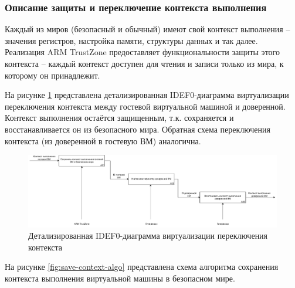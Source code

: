 \subsubsection{Описание защиты и переключение контекста выполнения}

Каждый из миров (безопасный и обычный) имеют свой контекст выполнения -- значения регистров, настройка памяти, структуры данных и так далее. Реализация ARM TrustZone предоставляет функциональности защиты этого контекста -- каждый контекст доступен для чтения и записи только из мира, к которому он принадлежит.

На рисунке \ref{fig:idef0-context-switch-2} представлена детализированная IDEF0-диаграмма виртуализации переключения контекста между гостевой виртуальной машиной и доверенной. Контекст выполнения остаётся защищенным, т.к. сохраняется и восстанавливается он из безопасного мира. Обратная схема переключения контекста (из доверенной в гостевую ВМ) аналогична.

\begin{figure}[h]
	\centering
	\includegraphics[width=\textwidth]{img/idef0-context-switch-2.pdf}
	\caption{Детализированная IDEF0-диаграмма виртуализации переключения контекста}
	\label{fig:idef0-context-switch-2}
\end{figure}

На рисунке \ref{fig:save-context-algo} представлена схема алгоритма сохранения контекста выполнения виртуальной машины в безопасном мире.

